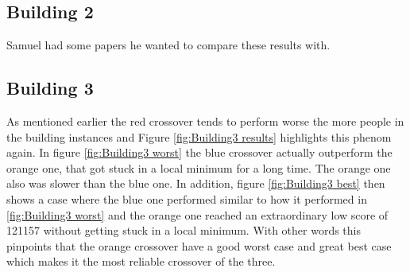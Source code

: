 \newpage

\subsection{Building 2}
Samuel had some papers he wanted to compare these results with.

\newpage

\subsection{Building 3}
As mentioned earlier the red crossover tends to perform worse the more people in the building instances and Figure \ref{fig:Building3 results} highlights this phenom again. In figure \ref{fig:Building3 worst} the blue crossover actually outperform the orange one, that got stuck in a local minimum for a long time. The orange one also was slower than the blue one. In addition, figure \ref{fig:Building3 best} then shows a case where the blue one performed similar to how it performed in \ref{fig:Building3 worst} and the orange one reached an extraordinary low score of 121157 without getting stuck in a local minimum. With other words this pinpoints that the orange crossover have a good worst case and great best case which makes it the most reliable crossover of the three.

